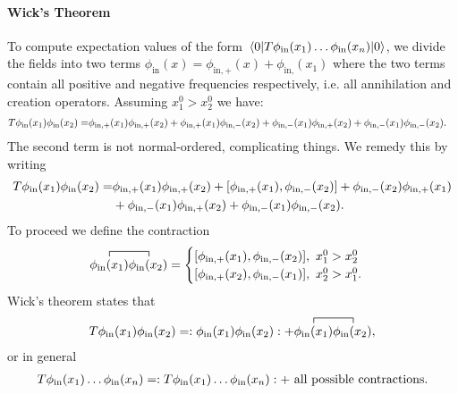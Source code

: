\paragraph{Wick's Theorem}
To compute expectation values of the form $\expval{\ensuremath{T}\phi_{\text{in}}(x_{1})\dots\phi_{\text{in}}(x_{n})}{0}$, we divide the fields into two terms $\phi_{\text{in}}(x) = \phi_{\text{in}, +}(x) + \phi_{\text{in}, }(x_{1})$ where the two terms contain all positive and negative frequencies respectively, i.e. all annihilation and creation operators. Assuming $x_{1}^{0} > x_{2}^{0}$ we have:
\begin{align*}
	T\phi_{\text{in}}(x_{1})\phi_{\text{in}}(x_{2}) =& \phi_{\text{in}, +}(x_{1})\phi_{\text{in}, +}(x_{2}) + \phi_{\text{in}, +}(x_{1})\phi_{\text{in}, -}(x_{2}) + \phi_{\text{in}, -}(x_{1})\phi_{\text{in}, +}(x_{2}) + \phi_{\text{in}, -}(x_{1})\phi_{\text{in}, -}(x_{2}).
\end{align*}
The second term is not normal-ordered, complicating things. We remedy this by writing
\begin{align*}
	\torp\phi_{\text{in}}(x_{1})\phi_{\text{in}}(x_{2}) =& \phi_{\text{in}, +}(x_{1})\phi_{\text{in}, +}(x_{2}) + \comm{\phi_{\text{in}, +}(x_{1})}{\phi_{\text{in}, -}(x_{2})} + \phi_{\text{in}, -}(x_{2})\phi_{\text{in}, +}(x_{1}) \\
	                                                     &+ \phi_{\text{in}, -}(x_{1})\phi_{\text{in}, +}(x_{2}) + \phi_{\text{in}, -}(x_{1})\phi_{\text{in}, -}(x_{2}).
\end{align*}
To proceed we define the contraction
\begin{align*}
	\contraction{}{\phi_{\text{in}}(x_{1})}{}{\phi_{\text{in}}(x_{2})}\phi_{\text{in}}(x_{1})\phi_{\text{in}}(x_{2}) =
	\begin{cases}
		\comm{\phi_{\text{in}, +}(x_{1})}{\phi_{\text{in}, -}(x_{2})},\ x_{1}^{0} > x_{2}^{0} \\
		\comm{\phi_{\text{in}, +}(x_{2})}{\phi_{\text{in}, -}(x_{1})},\ x_{2}^{0} > x_{1}^{0}.
	\end{cases}
\end{align*}
Wick's theorem states that
\begin{align*}
	\torp\phi_{\text{in}}(x_{1})\phi_{\text{in}}(x_{2}) = \nop{\phi_{\text{in}}(x_{1})\phi_{\text{in}}(x_{2})} + \contraction{}{\phi_{\text{in}}(x_{1})}{}{\phi_{\text{in}}(x_{2})}\phi_{\text{in}}(x_{1})\phi_{\text{in}}(x_{2}),
\end{align*}
or in general
\begin{align*}
	T\phi_{\text{in}}(x_{1})\dots\phi_{\text{in}}(x_{n}) = :T\phi_{\text{in}}(x_{1})\dots\phi_{\text{in}}(x_{n}): + \text{ all possible contractions}.
\end{align*}